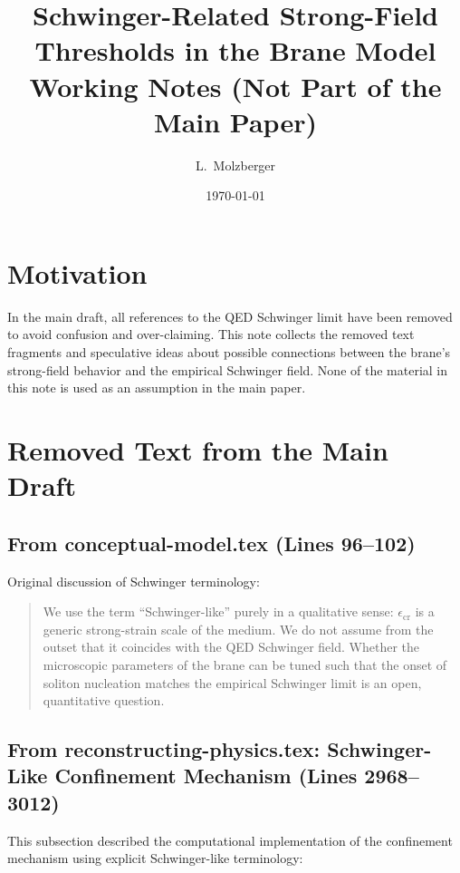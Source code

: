 \documentclass[11pt,a4paper]{article}
\title{Schwinger-Related Strong-Field Thresholds in the Brane Model\\[0.2em]
\large Working Notes (Not Part of the Main Paper)}
\author{L.~Molzberger}
\date{\today}
\begin{document}
\maketitle

\section{Motivation}

In the main draft, all references to the QED Schwinger limit have been
removed to avoid confusion and over-claiming. This note collects the
removed text fragments and speculative ideas about possible connections
between the brane's strong-field behavior and the empirical Schwinger
field. None of the material in this note is used as an assumption in
the main paper.

\section{Removed Text from the Main Draft}

\subsection{From conceptual-model.tex (Lines 96--102)}

Original discussion of Schwinger terminology:

\begin{quote}
We use the term ``Schwinger-like'' purely in a qualitative sense:
$\epsilon_{\text{cr}}$ is a generic strong-strain scale of the
medium. We do not assume from the outset that it coincides with
the QED Schwinger field. Whether the microscopic parameters of
the brane can be tuned such that the onset of soliton nucleation
matches the empirical Schwinger limit is an open, quantitative
question.
\end{quote}

\subsection{From reconstructing-physics.tex: Schwinger-Like Confinement Mechanism (Lines 2968--3012)}

This subsection described the computational implementation of the confinement mechanism
using explicit Schwinger-like terminology:
\end{document}
